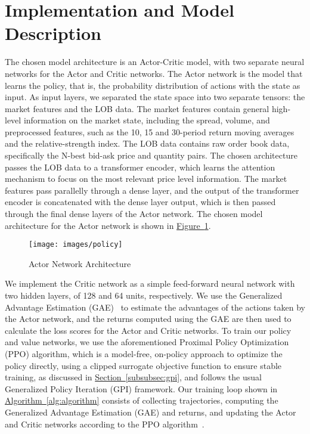 \section{Implementation and Model Description}
\label{sec:implementation-and-model-description}

The chosen model architecture is an Actor-Critic model, with two separate neural networks for the Actor and Critic networks.
The Actor network is the model that learns the policy, that is, the probability distribution of actions with the state as input.
As input layers, we separated the state space into two separate tensors: the market features and the LOB data.
The market features contain general high-level information on the market state, including the spread, volume,
and preprocessed features, such as the 10, 15 and 30-period return moving averages and the relative-strength index.
The LOB data contains raw order book data, specifically the N-best bid-ask price and quantity pairs.
The chosen architecture passes the LOB data to a transformer encoder,
which learns the attention mechanism to focus on the most relevant price level information.
The market features pass parallelly through a dense layer, and the output of the transformer encoder is concatenated with the dense layer output,
which is then passed through the final dense layers of the Actor network.
The chosen model architecture for the Actor network is shown in \hyperref[fig:actor-architecture]{Figure~\ref{fig:actor-architecture}}.

\begin{figure}[H]
    \centering
    \texttt{[image: images/policy]}
    \caption{Actor Network Architecture}
    \label{fig:actor-architecture}
\end{figure}

We implement the Critic network as a simple feed-forward neural network with two hidden layers, of 128 and 64 units, respectively.
We use the Generalized Advantage Estimation (GAE)~\cite{Schulman2015} to estimate the advantages of the actions taken by the Actor network,
and the returns computed using the GAE are then used to calculate the loss scores for the Actor and Critic networks.
To train our policy and value networks, we use the aforementioned Proximal Policy Optimization (PPO) algorithm,
which is a model-free, on-policy approach to optimize the policy directly, using a clipped surrogate objective function to ensure stable training,
as discussed in \hyperref[subsubsec:gpi]{Section~\ref{subsubsec:gpi}}, and follows the usual Generalized Policy Iteration (GPI) framework.
Our training loop shown in \hyperref[alg:algorithm]{Algorithm~\ref{alg:algorithm}} consists of collecting trajectories,
computing the Generalized Advantage Estimation (GAE) and returns,
and updating the Actor and Critic networks according to the PPO algorithm~\cite{Schulman2017}.

